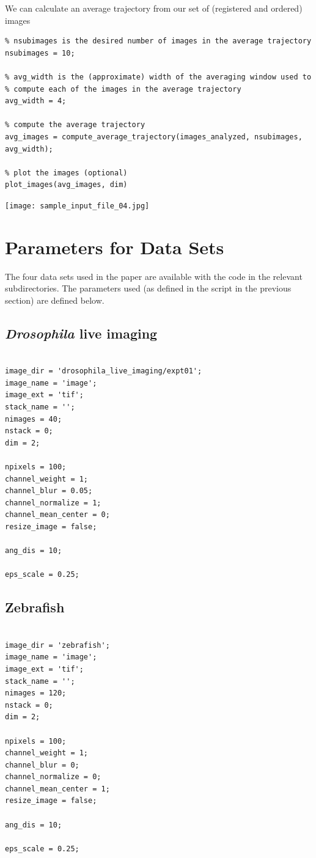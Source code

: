\documentclass[12pt]{article}
\begin{document}
\begin{par}
We can calculate an average trajectory from our set of (registered and ordered) images
\end{par} \vspace{1em}
\begin{verbatim}
% nsubimages is the desired number of images in the average trajectory
nsubimages = 10;

% avg_width is the (approximate) width of the averaging window used to
% compute each of the images in the average trajectory
avg_width = 4;

% compute the average trajectory
avg_images = compute_average_trajectory(images_analyzed, nsubimages, avg_width);

% plot the images (optional)
plot_images(avg_images, dim)
\end{verbatim}

\texttt{[image: sample\_input\_file\_04.jpg]}

\section{Parameters for Data Sets}

The four data sets used in the paper are available with the code in the relevant subdirectories. The parameters used (as defined in the script in the previous section) are defined below. 

\subsection{{\em Drosophila} live imaging}

\begin{verbatim}

image_dir = 'drosophila_live_imaging/expt01';
image_name = 'image';
image_ext = 'tif';
stack_name = '';
nimages = 40;
nstack = 0;
dim = 2;

npixels = 100;
channel_weight = 1;
channel_blur = 0.05;
channel_normalize = 1;
channel_mean_center = 0;
resize_image = false;

ang_dis = 10;

eps_scale = 0.25;

\end{verbatim}


\subsection{Zebrafish}

\begin{verbatim}

image_dir = 'zebrafish';
image_name = 'image';
image_ext = 'tif';
stack_name = '';
nimages = 120;
nstack = 0;
dim = 2;

npixels = 100;
channel_weight = 1;
channel_blur = 0;
channel_normalize = 0;
channel_mean_center = 1;
resize_image = false;

ang_dis = 10;

eps_scale = 0.25;

\end{verbatim}
\end{document}
